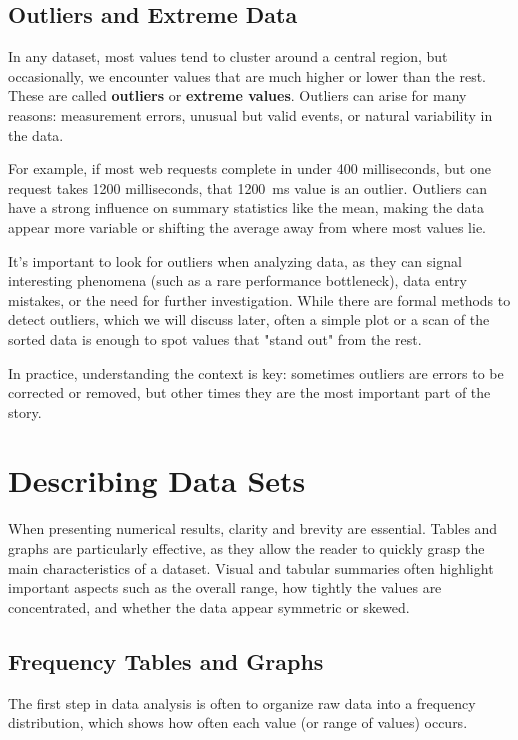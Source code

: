 \subsection*{Outliers and Extreme Data}

In any dataset, most values tend to cluster around a central region, but occasionally, we encounter values that are much higher or lower than the rest. These are called \textbf{outliers} or \textbf{extreme values}. Outliers can arise for many reasons: measurement errors, unusual but valid events, or natural variability in the data.

For example, if most web requests complete in under 400 milliseconds, but one request takes 1200 milliseconds, that 1200~ms value is an outlier. Outliers can have a strong influence on summary statistics like the mean, making the data appear more variable or shifting the average away from where most values lie.

It's important to look for outliers when analyzing data, as they can signal interesting phenomena (such as a rare performance bottleneck), data entry mistakes, or the need for further investigation. While there are formal methods to detect outliers, which we will discuss later, often a simple plot or a scan of the sorted data is enough to spot values that "stand out" from the rest.

In practice, understanding the context is key: sometimes outliers are errors to be corrected or removed, but other times they are the most important part of the story.

\section{Describing Data Sets}
When presenting numerical results, clarity and brevity are essential. Tables and graphs are particularly effective, as they allow the reader to quickly grasp the main characteristics of a dataset. Visual and tabular summaries often highlight important aspects such as the overall range, how tightly the values are concentrated, and whether the data appear symmetric or skewed.

\subsection*{Frequency Tables and Graphs} \label{sub:frequency_tables_and_graphs}

The first step in data analysis is often to organize raw data into a frequency distribution, which shows how often each value (or range of values) occurs.

